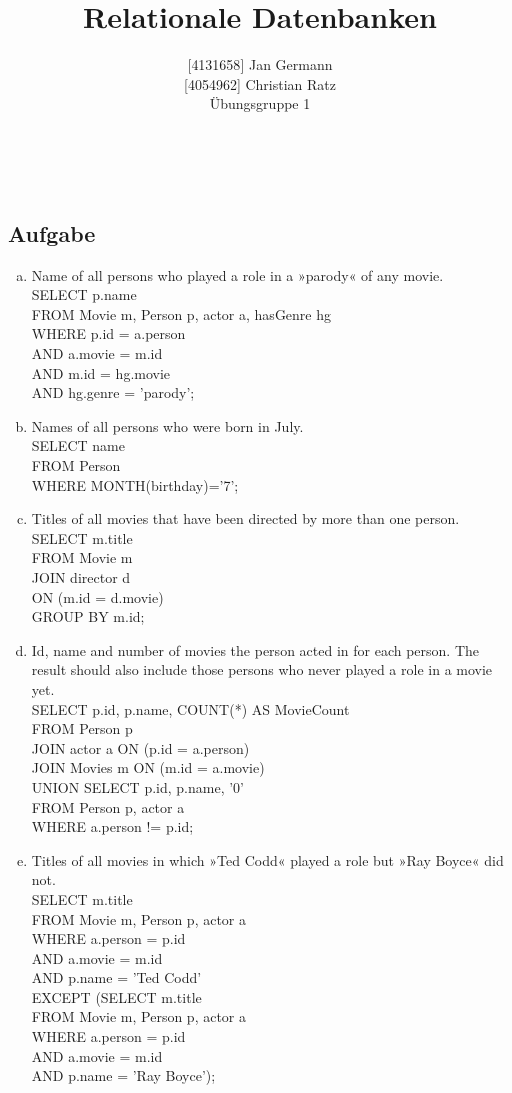 \documentclass[11pt,a4paper,DIV=9]{scrartcl}
\author{{[}4131658{]} Jan Germann \\{[}4054962{]} Christian Ratz\\Übungsgruppe 1}
\title{Relationale Datenbanken}
\newcounter{temp}
\newcommand{\aufgabe}[1]{
  \setcounter{temp}{\value{subsection}}
  \setcounter{subsection}{#1}
  \addtocounter{subsection}{-1}
  \subsection{Aufgabe}
  \setcounter{subsection}{\value{temp}}
}
\renewcommand{\author}[1]{\renewcommand{\author}{#1}}
\renewcommand{\title}[1]{\renewcommand{\title}{#1}}
\newcommand{\makehomeworktitle}{
  \begin{minipage}[t]{6.5cm}
    \sf{\author}
  \end{minipage}
  \begin{minipage}[t]{6.5cm}
    \begin{flushright}
      \sf{\title\\\today}
    \end{flushright}
  \end{minipage}
  \\[0.2cm]
  \begin{center}
    \sf{
      \color{blue}{
        \LARGE{Aufgabenblatt \blattnr}
      }
    }
  \end{center}
  \vspace{0.1cm}
}
\begin{document}
\makehomeworktitle
\aufgabe{1}
  \begin{enumerate}[a.]
      \item Name of all persons who played a role in a »parody« of any movie.\hfill\\
      SELECT p.name \\
      FROM Movie m, Person p, actor a, hasGenre hg \\
      WHERE p.id = a.person \\
      AND a.movie = m.id \\
      AND m.id = hg.movie \\
      AND hg.genre = 'parody';

      \item Names of all persons who were born in July.\hfill\\
      SELECT name \\
      FROM Person \\
      WHERE MONTH(birthday)='7';
      	
      \item Titles of all movies that have been directed by more than one person.\hfill\\
      SELECT m.title \\
      FROM Movie m \\
      JOIN director d \\
      ON (m.id = d.movie) \\
      GROUP BY m.id; \\

      \item Id, name and number of movies the person acted in for each person. The result should also include those persons who never played a role in a movie yet.\hfill\\
      SELECT p.id, p.name, COUNT(*) AS MovieCount \\
      FROM Person p \\
      JOIN actor a ON (p.id = a.person) \\
      JOIN Movies m ON (m.id = a.movie) \\

      UNION
      SELECT p.id, p.name, '0' \\
      FROM Person p, actor a \\
      WHERE a.person != p.id;

      \item Titles of all movies in which »Ted Codd« played a role but »Ray Boyce« did not.\hfill\\
      SELECT m.title \\
      FROM Movie m, Person p, actor a \\ 
      WHERE a.person = p.id \\
      AND a.movie = m.id \\
      AND p.name = 'Ted Codd' \\
      EXCEPT (SELECT m.title \\
      FROM Movie m, Person p, actor a \\
      WHERE a.person = p.id \\
      AND a.movie = m.id \\
      AND p.name = 'Ray Boyce');


\end{enumerate}
\end{document}
